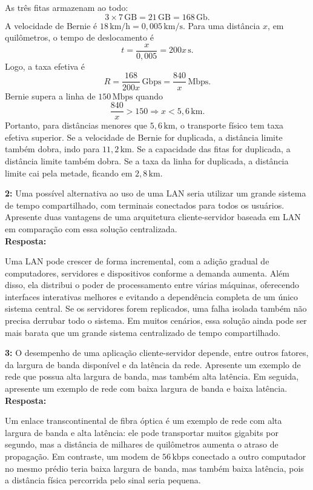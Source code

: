 \documentclass[12pt,a4paper]{report}
\begin{document}
As três fitas armazenam ao todo:
\[
    3 \times 7\,\text{GB}=21\,\text{GB}=168\,\text{Gb}.
\]
A velocidade de Bernie é \(18\,\text{km/h}=0{,}005\,\text{km/s}\). Para uma distância \(x\), em quilômetros, o tempo de deslocamento é
\[
    t=\frac{x}{0{,}005}=200x\,\text{s}.
\]
Logo, a taxa efetiva é
\[
    R=\frac{168}{200x}\,\text{Gbps}=\frac{840}{x}\,\text{Mbps}.
\]
Bernie supera a linha de \(150\,\text{Mbps}\) quando
\[
    \frac{840}{x}>150 \Rightarrow x<5{,}6\,\text{km}.
\]
Portanto, para distâncias menores que \(5{,}6\,\text{km}\), o transporte físico tem taxa efetiva superior. Se a velocidade de Bernie for duplicada, a distância limite também dobra, indo para \(11{,}2\,\text{km}\). Se a capacidade das fitas for duplicada, a distância limite também dobra. Se a taxa da linha for duplicada, a distância limite cai pela metade, ficando em \(2{,}8\,\text{km}\).

\vspace{0.6cm}

\noindent \textbf{2:} Uma possível alternativa ao uso de uma LAN seria utilizar um grande sistema de tempo compartilhado, com terminais conectados para todos os usuários. Apresente duas vantagens de uma arquitetura cliente-servidor baseada em LAN em comparação com essa solução centralizada. \\
\textbf{Resposta:}

Uma LAN pode crescer de forma incremental, com a adição gradual de computadores, servidores e dispositivos conforme a demanda aumenta. Além disso, ela distribui o poder de processamento entre várias máquinas, oferecendo interfaces interativas melhores e evitando a dependência completa de um único sistema central. Se os servidores forem replicados, uma falha isolada também não precisa derrubar todo o sistema. Em muitos cenários, essa solução ainda pode ser mais barata que um grande sistema centralizado de tempo compartilhado.

\vspace{0.6cm}

\noindent \textbf{3:} O desempenho de uma aplicação cliente-servidor depende, entre outros fatores, da largura de banda disponível e da latência da rede. Apresente um exemplo de rede que possua alta largura de banda, mas também alta latência. Em seguida, apresente um exemplo de rede com baixa largura de banda e baixa latência. \\
\textbf{Resposta:}

Um enlace transcontinental de fibra óptica é um exemplo de rede com alta largura de banda e alta latência: ele pode transportar muitos gigabits por segundo, mas a distância de milhares de quilômetros aumenta o atraso de propagação. Em contraste, um modem de \(56\,\text{kbps}\) conectado a outro computador no mesmo prédio teria baixa largura de banda, mas também baixa latência, pois a distância física percorrida pelo sinal seria pequena.
\end{document}
